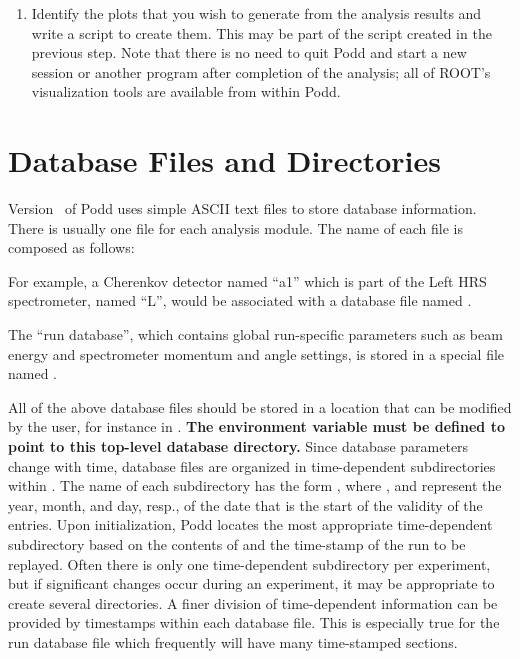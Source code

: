 {\begin{enumerate}
	in Step~\ref{offl:item:step3}. Often, a script from a
	previous experiment, or one of the examples in
	the directory , can serve as a guide.
	The script usually also locates raw data files, creates
	one or more  objects, configures various
	options of the event loop object , and
	starts the replay. In particular, the names of the output
	file, the output definition file, and the logicals definition
	file must be given to .
  \item Identify the plots that you wish to generate from the analysis
        results and write a script to create them. This may be part
	of the script created in the previous step. 
	Note that there is no need to quit Podd and start a new
	session or another program after completion of the analysis; all of
	ROOT's visualization tools are available from within Podd.
\end{enumerate}

\section{Database Files and Directories}
\label{offl:sec:database}
Version \cppaver\ of Podd uses simple ASCII text files
to store database information. There is usually one file for each 
analysis module. The name of each file is composed as follows:\\

\noindent {}
\vspace{2ex}

For example, a Cherenkov detector named ``a1'' which is part of the
Left HRS spectrometer, named ``L'', would be associated with 
a database file named .

The ``run database'', which contains global run-specific parameters
such as beam energy and spectrometer momentum and angle settings,
is stored in a special file named .

All of the above database files should be stored in a location
that can be modified by the user, for instance in .
{\bf The environment variable 
must be defined to point to this top-level database
directory.} Since database parameters change with time, database files
are organized in time-dependent subdirectories within .
The name of each subdirectory has the form , where 
,  and  
represent the year, month, and day, resp., of the 
date that is the start of the validity of the entries. Upon initialization,
Podd locates the most appropriate time-dependent subdirectory based on
the contents of  
and the time-stamp of the run to be replayed.
Often there is only one time-dependent subdirectory per experiment, but
if significant changes occur during an experiment, it may be appropriate to
create several directories.
A finer division of time-dependent information
can be provided by timestamps within each database file. This
is especially true for the run database file which frequently
will have many time-stamped sections.

}
